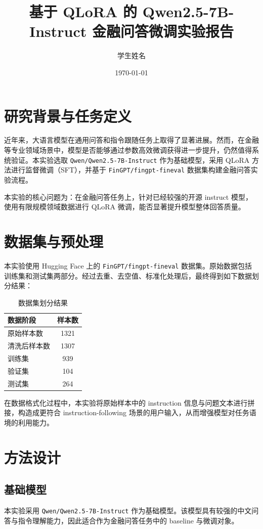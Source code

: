 \documentclass[UTF8,a4paper,12pt]{ctexart}
\title{基于 QLoRA 的 Qwen2.5-7B-Instruct 金融问答微调实验报告}
\author{学生姓名}
\date{\today}
\begin{document}
\maketitle

\section{研究背景与任务定义}
近年来，大语言模型在通用问答和指令跟随任务上取得了显著进展。然而，在金融等专业领域场景中，模型是否能够通过参数高效微调获得进一步提升，仍然值得系统验证。本实验选取 \texttt{Qwen/Qwen2.5-7B-Instruct} 作为基础模型，采用 QLoRA 方法进行监督微调（SFT），并基于 \texttt{FinGPT/fingpt-fineval} 数据集构建金融问答实验流程。

本实验的核心问题为：在金融问答任务上，针对已经较强的开源 instruct 模型，使用有限规模领域数据进行 QLoRA 微调，能否显著提升模型整体回答质量。

\section{数据集与预处理}
本实验使用 Hugging Face 上的 \texttt{FinGPT/fingpt-fineval} 数据集。原始数据包括训练集和测试集两部分。经过去重、去空值、标准化处理后，最终得到如下数据划分结果：

\begin{table}[H]
\centering
\caption{数据集划分结果}
\begin{tabular}{lc}
\toprule
数据阶段 & 样本数 \\
\midrule
原始样本数 & 1321 \\
清洗后样本数 & 1307 \\
训练集 & 939 \\
验证集 & 104 \\
测试集 & 264 \\
\bottomrule
\end{tabular}
\end{table}

在数据格式化过程中，本实验将原始样本中的 instruction 信息与问题文本进行拼接，构造成更符合 instruction-following 场景的用户输入，从而增强模型对任务语境的利用能力。

\section{方法设计}
\subsection{基础模型}
本实验采用 \texttt{Qwen/Qwen2.5-7B-Instruct} 作为基础模型。该模型具有较强的中文问答与指令理解能力，因此适合作为金融问答任务中的 baseline 与微调对象。
\end{document}
